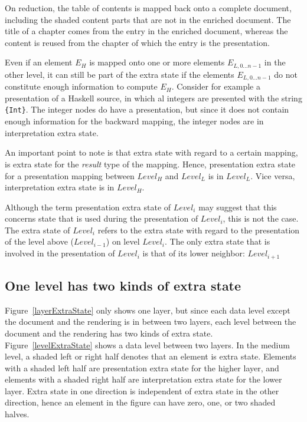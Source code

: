 On reduction, the table of contents is mapped back onto a complete document, including the shaded content parts that are not in the enriched document. The title of a chapter comes from the entry in the enriched document, whereas the content is reused from the chapter of which the entry is the presentation. 



Even if an element $E_H$ is mapped onto one or more elements $E_{L,0\dots n-1}$  in the other level, it can still be part of the extra state if the elements $E_{L,0\dots n-1}$ do not constitute enough information to compute $E_H$. Consider for example a presentation of a Haskell source, in which al integers are presented with the string \verb|{Int}|. The integer nodes do have a presentation, but since it does not contain enough information for the backward mapping, the integer nodes are in interpretation extra state.  

An important point to note is that extra state with regard to a certain mapping, is extra state for the {\em result} type of the mapping. Hence, presentation extra state for a presentation mapping between $Level_{H}$ and $Level_{L}$ is in $Level_{L}$. Vice versa, interpretation extra state is in $Level_{H}$.

\bc Although the term presentation extra state of $Level_i$ may suggest that this concerns state that is used during the presentation of $Level_i$, this is not the case. The extra state of $Level_i$ refers to the extra state with regard to the presentation of the level above ($Level_{i-1}$) on level $Level_i$. The only extra state that is involved in the presentation of $Level_i$ is that of its lower neighbor: $Level_{i+1}$
\ec


%																
\subsection{One level has two kinds of extra state} \label{sect:oneLevelDoubleES}

Figure~\ref{layerExtraState} only shows one layer, but since each data level except the document and the rendering is in between two layers, each level between the document and the rendering has two kinds of extra state. Figure~\ref{levelExtraState} shows a data level between two layers. In the medium level, a shaded left or right half denotes that an element is extra state. Elements with a shaded left half are presentation extra state for the higher layer, and elements with a shaded right half are interpretation extra state for the lower layer. Extra state in one direction is independent of extra state in the other direction, hence an element in the figure can have zero, one, or two shaded halves.

